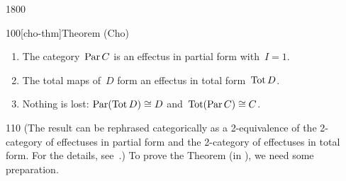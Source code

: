 \begin{parsec}{1800}
\begin{point}{100}[cho-thm]{Theorem (Cho)}
\begin{enumerate}
\item
The category~$\operatorname{Par} C$ is an effectus in partial form
        with~$I = 1$.
\item
The total maps of~$D$ form an effectus in total form~$\operatorname{Tot} D$.
\item
    Nothing is lost:
        $\operatorname{Par} (\operatorname{Tot} D) \cong D$ and~$\operatorname{Tot} (\operatorname{Par} C )\cong C$.
\end{enumerate}
\begin{point}{110}%
(The result can be rephrased categorically as
    a 2-equivalence of the 2-category
    of effectuses in partial form and
    the 2-category of effectuses in total form.
    For the details, see~\cite[\S5]{kentapartial}.)
To prove the Theorem
    (in ),
    we need some preparation.
\end{point}
\end{point}
\end{parsec}
